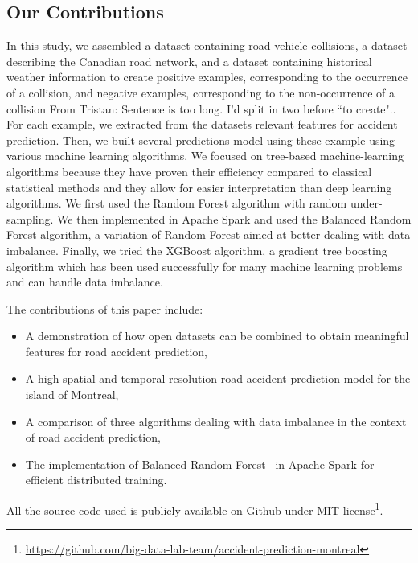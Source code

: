 \documentclass[conference]{IEEEtran}
\newcommand{\TG}[1]{\colorlet{saved}{.}\color{orange}From Tristan: #1\color{saved}}
\begin{document}

\subsection{Our Contributions}

In this study, we assembled a dataset containing road vehicle collisions, a dataset describing the Canadian road network, and a dataset containing historical weather information to create positive examples, corresponding to the occurrence of a collision, and negative examples, corresponding to the non-occurrence of a collision \TG{Sentence is too long. I'd split in two before ``to create".}. For each example, we extracted from the datasets relevant features for accident prediction. Then, we built several predictions model using these example using various machine learning algorithms. We focused on tree-based machine-learning algorithms because they have proven their efficiency compared to classical statistical methods \cite{Chang2005, Chang2005b} and they allow for easier interpretation than deep learning algorithms. We first used the Random Forest algorithm with random under-sampling. We then implemented in Apache Spark and used the Balanced Random Forest algorithm\cite{Chen2004}, a variation of Random Forest aimed at better dealing with data imbalance. Finally, we  tried the XGBoost algorithm, a gradient tree boosting algorithm which has been used successfully for many machine learning problems and can handle data imbalance\cite{xgboost_doc}.

The contributions of this paper include: 
\begin{itemize}
\item A demonstration of how open datasets can be combined to obtain
meaningful features for road accident prediction,
\item A high spatial and temporal resolution road accident prediction model for the island of Montreal,
\item A comparison of three algorithms dealing with data imbalance in the context of road accident prediction,
\item The implementation of Balanced Random Forest~\cite{Chen2004} in Apache Spark for efficient distributed training.
\end{itemize}

All the source code used is publicly available on Github under MIT
license\footnote{\url{https://github.com/big-data-lab-team/accident-prediction-montreal}}.
\end{document}
